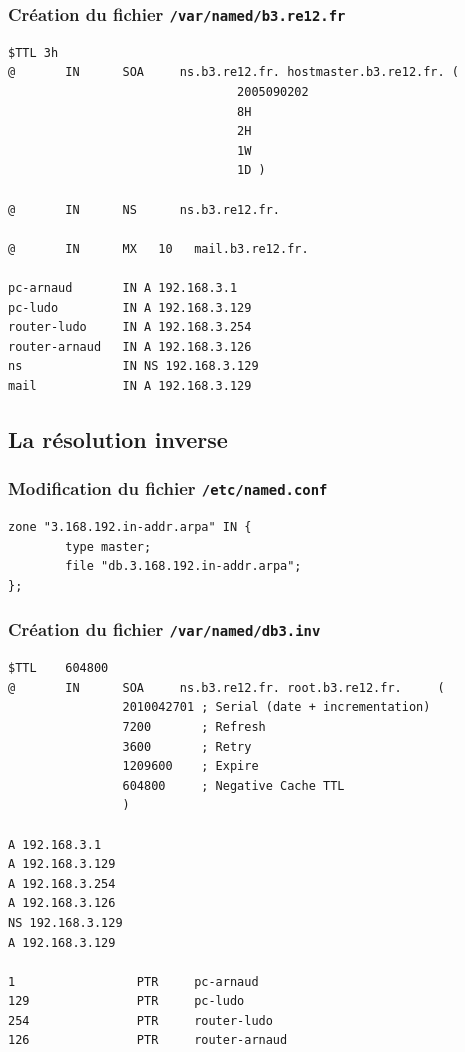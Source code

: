 \documentclass[12pt,a4paper,notitlepage]{article}
\begin{document}
\subsubsection{Création du fichier \texttt{/var/named/b3.re12.fr}}

\begin{lstlisting}[title=Ensemble des paramètres de la zone]
$TTL 3h
@       IN      SOA     ns.b3.re12.fr. hostmaster.b3.re12.fr. (
                                2005090202
                                8H
                                2H
                                1W
                                1D )

@       IN      NS      ns.b3.re12.fr.

@       IN      MX   10   mail.b3.re12.fr.

pc-arnaud       IN A 192.168.3.1
pc-ludo         IN A 192.168.3.129
router-ludo     IN A 192.168.3.254
router-arnaud   IN A 192.168.3.126
ns              IN NS 192.168.3.129
mail            IN A 192.168.3.129
\end{lstlisting}

\clearpage
\subsection{La résolution inverse}

\subsubsection{Modification du fichier \texttt{/etc/named.conf}}

\begin{lstlisting}[title=Ajout de la zone inverse à gérer]
zone "3.168.192.in-addr.arpa" IN {
        type master;
        file "db.3.168.192.in-addr.arpa";
};
\end{lstlisting}

\subsubsection{Création du fichier \texttt{/var/named/db3.inv}}

\begin{lstlisting}[title=Paramètres de la zone inverse]
$TTL    604800
@       IN      SOA     ns.b3.re12.fr. root.b3.re12.fr.     (
                2010042701 ; Serial (date + incrementation)
                7200       ; Refresh
                3600       ; Retry
                1209600    ; Expire
                604800     ; Negative Cache TTL
                )

A 192.168.3.1
A 192.168.3.129
A 192.168.3.254
A 192.168.3.126
NS 192.168.3.129
A 192.168.3.129

1                 PTR     pc-arnaud
129               PTR     pc-ludo
254               PTR     router-ludo
126               PTR     router-arnaud
\end{lstlisting}
\end{document}
